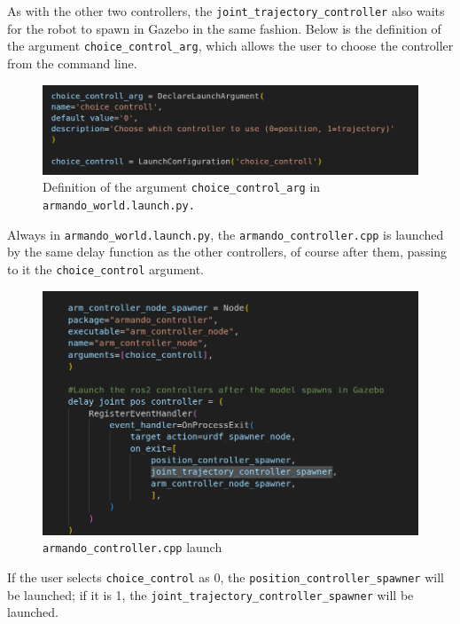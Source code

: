 \documentclass{article}
\begin{document}
\begin{enumerate}
\begin{figure}[H]
  
\end{figure}

As with the other two controllers, the \texttt{joint\_trajectory\_controller} 
also waits for the robot to spawn in Gazebo in the same fashion. 
Below is the definition of the argument \texttt{choice\_control\_arg}, 
which allows the user to choose the controller from the command line.

\begin{figure}[H] %
  \centering
  \includegraphics[width=1\textwidth]{Images/4D_4.png} %
  \caption{Definition of the argument \texttt{choice\_control\_arg} in 
\texttt{armando\_world.launch.py.}} %
  \label{fig:publishCommand}
\end{figure}

Always in \texttt{armando\_world.launch.py}, the \texttt{armando\_controller.cpp} 
is launched by the same delay function as the other controllers, 
of course after them, passing to it the \texttt{choice\_control} argument.
\begin{figure}[H] %
  \centering
  \includegraphics[width=1\textwidth]{Images/4D_5.png} %
  \caption{\texttt{armando\_controller.cpp} launch } %
  \label{fig:publishCommand}
\end{figure}
If the user selects \texttt{choice\_control} as 0, the 
\texttt{position\_controller\_spawner} will be launched; 
if it is 1, the \texttt{joint\_trajectory\_controller\_spawner} will be launched.


\end{enumerate}
\end{document}
